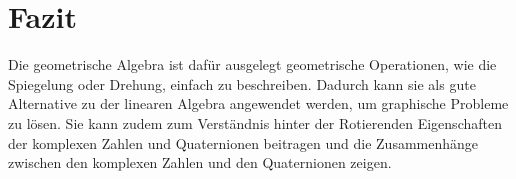%
%
%
\section{Fazit}

Die geometrische Algebra ist dafür ausgelegt geometrische Operationen, wie die Spiegelung oder Drehung, einfach zu beschreiben. Dadurch kann sie als gute Alternative zu der linearen Algebra angewendet werden, um graphische Probleme zu lösen. Sie kann zudem zum Verständnis hinter der Rotierenden Eigenschaften der komplexen Zahlen und Quaternionen beitragen und die Zusammenhänge zwischen den komplexen Zahlen und den Quaternionen zeigen.